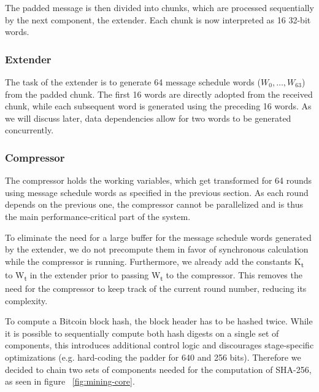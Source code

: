 The padded message is then divided into chunks, which are processed sequentially by the next component, the extender. Each chunk is now interpreted as 16 32-bit words.

\subsubsection*{Extender}

The task of the extender is to generate 64 message schedule words ($W_0,\dots, W_{63}$) from the padded chunk. The first 16 words are directly adopted from the received chunk, while each subsequent word is generated using the preceding 16 words. As we will discuss later, data dependencies allow for two words to be generated concurrently. 

\subsubsection*{Compressor}

The compressor holds the working variables, which get transformed for 64 rounds using message schedule words as specified in the previous section. As each round depends on the previous one, the compressor cannot be parallelized and is thus the main performance-critical part of the system.

To eliminate the need for a large buffer for the message schedule words generated by the extender, we do not precompute them in favor of synchronous calculation while the compressor is running. Furthermore, we already add the constants K\textsubscript{t} to W\textsubscript{t} in the extender prior to passing W\textsubscript{t} to the compressor. This removes the need for the compressor to keep track of the current round number, reducing its complexity.

To compute a Bitcoin block hash, the block header has to be hashed twice. While it is possible to sequentially compute both hash digests on a single set of components, this introduces additional control logic and discourages stage-specific optimizations (e.g. hard-coding the padder for 640 and 256 bits). Therefore we decided to chain two sets of components needed for the computation of SHA-256, as seen in figure~ \ref{fig:mining-core}.

